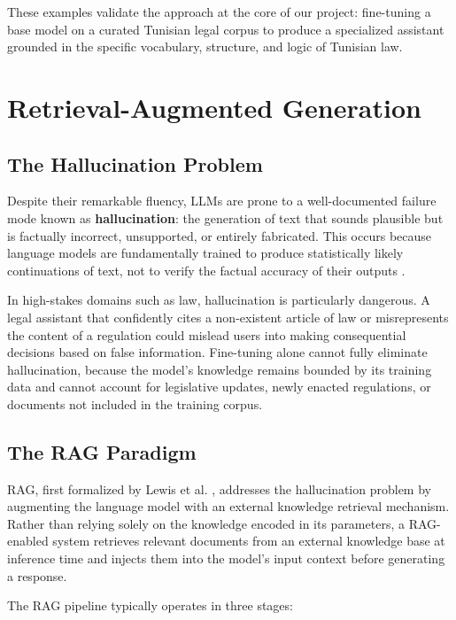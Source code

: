 These examples validate the approach at the core of our project: fine-tuning
a base model on a curated Tunisian legal corpus to produce a specialized
assistant grounded in the specific vocabulary, structure, and logic of
Tunisian law.

\section{Retrieval-Augmented Generation}
\label{sec:rag}

\subsection{The Hallucination Problem}

Despite their remarkable fluency, \ac{LLM}s are prone to a well-documented
failure mode known as \textbf{hallucination}: the generation of text that
sounds plausible but is factually incorrect, unsupported, or entirely
fabricated. This occurs because language models are fundamentally trained to
produce statistically likely continuations of text, not to verify the factual
accuracy of their outputs \cite{lewis2020rag}.

\vspace{1em}

In high-stakes domains such as law, hallucination is particularly dangerous.
A legal assistant that confidently cites a non-existent article of law or
misrepresents the content of a regulation could mislead users into making
consequential decisions based on false information. Fine-tuning alone cannot
fully eliminate hallucination, because the model's knowledge remains bounded
by its training data and cannot account for legislative updates, newly enacted
regulations, or documents not included in the training corpus.

\subsection{The RAG Paradigm}

\ac{RAG}, first formalized by Lewis et al. \cite{lewis2020rag}, addresses
the hallucination problem by augmenting the language model with an external
knowledge retrieval mechanism. Rather than relying solely on the knowledge
encoded in its parameters, a \ac{RAG}-enabled system retrieves relevant
documents from an external knowledge base at inference time and injects
them into the model's input context before generating a response.

The \ac{RAG} pipeline typically operates in three stages:

